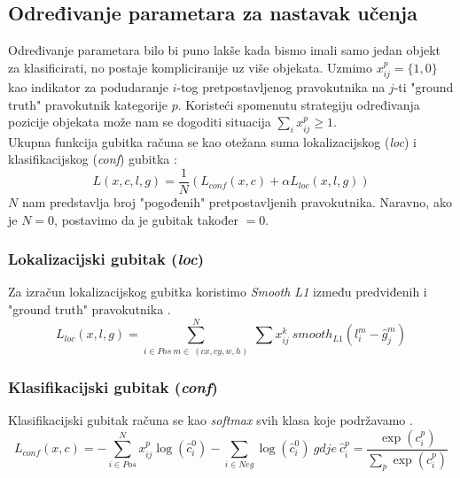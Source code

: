 \subsection{Određivanje parametara za nastavak učenja}
Određivanje parametara bilo bi puno lakše kada bismo imali samo jedan objekt za klasificirati, no postaje kompliciranije uz više objekata.
Uzmimo $x^p_{ij}=\{1,0\}$ kao indikator za podudaranje $i$-tog pretpostavljenog pravokutnika na $j$-ti "ground truth" pravokutnik kategorije $p$.
Koristeći spomenutu strategiju određivanja pozicije objekata može nam se dogoditi situacija $\sum_i{x_{ij}^p} \geq 1$. \\
Ukupna funkcija gubitka računa se kao otežana suma lokalizacijskog (\emph{loc}) i klasifikacijskog (\emph{conf}) gubitka \cite{liu2016ssd}:
\begin{equation}
	\label{eq:lokKlasLoss}
	L(x,c,l,g)=\frac{1}{N}(L_{conf}(x,c)+\alpha L_{loc}(x,l,g))
\end{equation}
$N$ nam predstavlja broj "pogođenih" pretpostavljenih pravokutnika. Naravno, ako je $N=0$, postavimo da je gubitak također $=0$.
\subsubsection{Lokalizacijski gubitak (\emph{loc})}
Za izračun lokalizacijskog gubitka koristimo \emph{Smooth L1} između predviđenih i "ground truth" pravokutnika \cite{liu2016ssd}.
\begin{equation}
	\label{eq:lokLoss}
	L_{loc}(x,l,g)=\sum_{i\in Pos\ m \in\ (cx, cy, w, h)}^{N} \ \sum x_{ij}^k\ smooth_{L1}(l_i^m - \hat g_j^m)
\end{equation}
\subsubsection{Klasifikacijski gubitak (\emph{conf})}
Klasifikacijski gubitak računa se kao \emph{softmax} svih klasa koje podržavamo \cite{liu2016ssd}.
\begin{equation}
	\label{eq:klasLoss}
	L_{conf}(x,c)=-\sum_{i \in Pos}^N x_{ij}^p \log(\hat c_i^0) - \sum_{i \in Neg} \log(\hat c_i^0 ) \ {gdje} \ \hat c_i^p=\frac{\exp(c_i^p)}{\sum_p \exp(c_i^p)}
\end{equation}

